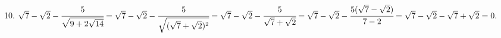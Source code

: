 10. $\sqrt{7}-\sqrt{2}-\cfrac{5}{\sqrt{9+2\sqrt{14}}}=\sqrt{7}-\sqrt{2}-\cfrac{5}{\sqrt{(\sqrt{7}+\sqrt{2})^2}}=
\sqrt{7}-\sqrt{2}-\cfrac{5}{\sqrt{7}+\sqrt{2}}=\sqrt{7}-\sqrt{2}-\cfrac{5(\sqrt{7}-\sqrt{2})}{7-2}=\sqrt{7}-\sqrt{2}-\sqrt{7}+\sqrt{2}=0.$\\
